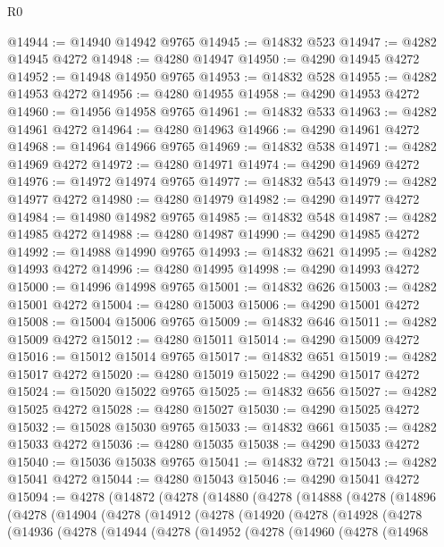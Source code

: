 \begin{lexlean}{R0}
\begin{coremodule}
@14944 := @14940 @14942 @9765
@14945 := @14832 @523
@14947 := @4282 @14945 @4272
@14948 := @4280 @14947
@14950 := @4290 @14945 @4272
@14952 := @14948 @14950 @9765
@14953 := @14832 @528
@14955 := @4282 @14953 @4272
@14956 := @4280 @14955
@14958 := @4290 @14953 @4272
@14960 := @14956 @14958 @9765
@14961 := @14832 @533
@14963 := @4282 @14961 @4272
@14964 := @4280 @14963
@14966 := @4290 @14961 @4272
@14968 := @14964 @14966 @9765
@14969 := @14832 @538
@14971 := @4282 @14969 @4272
@14972 := @4280 @14971
@14974 := @4290 @14969 @4272
@14976 := @14972 @14974 @9765
@14977 := @14832 @543
@14979 := @4282 @14977 @4272
@14980 := @4280 @14979
@14982 := @4290 @14977 @4272
@14984 := @14980 @14982 @9765
@14985 := @14832 @548
@14987 := @4282 @14985 @4272
@14988 := @4280 @14987
@14990 := @4290 @14985 @4272
@14992 := @14988 @14990 @9765
@14993 := @14832 @621
@14995 := @4282 @14993 @4272
@14996 := @4280 @14995
@14998 := @4290 @14993 @4272
@15000 := @14996 @14998 @9765
@15001 := @14832 @626
@15003 := @4282 @15001 @4272
@15004 := @4280 @15003
@15006 := @4290 @15001 @4272
@15008 := @15004 @15006 @9765
@15009 := @14832 @646
@15011 := @4282 @15009 @4272
@15012 := @4280 @15011
@15014 := @4290 @15009 @4272
@15016 := @15012 @15014 @9765
@15017 := @14832 @651
@15019 := @4282 @15017 @4272
@15020 := @4280 @15019
@15022 := @4290 @15017 @4272
@15024 := @15020 @15022 @9765
@15025 := @14832 @656
@15027 := @4282 @15025 @4272
@15028 := @4280 @15027
@15030 := @4290 @15025 @4272
@15032 := @15028 @15030 @9765
@15033 := @14832 @661
@15035 := @4282 @15033 @4272
@15036 := @4280 @15035
@15038 := @4290 @15033 @4272
@15040 := @15036 @15038 @9765
@15041 := @14832 @721
@15043 := @4282 @15041 @4272
@15044 := @4280 @15043
@15046 := @4290 @15041 @4272
@15094 := @4278
    (@14872
      (@4278
        (@14880
          (@4278
            (@14888
              (@4278
                (@14896
                  (@4278
                    (@14904
                      (@4278
                        (@14912
                          (@4278
                            (@14920
                              (@4278
                                (@14928
                                  (@4278
                                    (@14936
                                      (@4278
                                        (@14944
                                          (@4278
                                            (@14952
                                              (@4278
                                                (@14960
                                                  (@4278
                                                    (@14968

\end{coremodule}
\end{lexlean}
